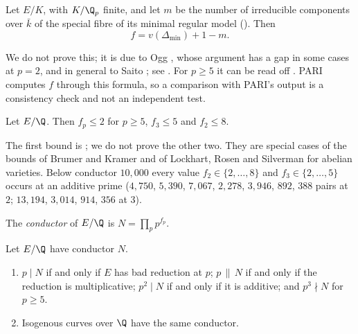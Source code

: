 \begin{theorem}\label{thm:reduction:ogg}
Let $E/K$, with $K/\Q_p$ finite, and let $m$ be the number of irreducible components over $\bar k$ of the special
fibre of its minimal regular model (). Then
\[
f=v(\Delta_{\min})+1-m .
\]
\end{theorem}

We do not prove this; it is due to Ogg \cite{Ogg}, whose argument has a gap in some cases at $p=2$, and in general to
Saito \cite{Saito88}; see \cite[IV.11]{SilvermanATAEC}. For $p\ge5$ it can be read off . PARI computes
$f$ through this formula, so a comparison with PARI's output is a consistency check and not an independent test.

\begin{theorem}\label{thm:reduction:conductor-bounds}
Let $E/\Q$. Then $f_p\le2$ for $p\ge5$, $f_3\le5$ and $f_2\le8$.
\end{theorem}

The first bound is ; we do not prove the other two. They are special cases of the
bounds of Brumer and Kramer \cite{BrumerKramer94} and of Lockhart, Rosen and Silverman \cite{LockhartRosenSilverman93} for
abelian varieties. Below conductor $10{,}000$ every value $f_2\in\{2,\dots,8\}$ and $f_3\in\{2,\dots,5\}$ occurs at an additive
prime ($4{,}750$, $5{,}390$, $7{,}067$, $2{,}278$, $3{,}946$, $892$, $388$ pairs at $2$; $13{,}194$, $3{,}014$, $914$, $356$ at
$3$).

\begin{definition}\label{def:reduction:conductor}
The \emph{conductor} of $E/\Q$ is $N=\prod_pp^{f_p}$.
\end{definition}

\begin{proposition}\label{prop:reduction:conductor-properties}
Let $E/\Q$ have conductor $N$.
\begin{enumerate}[label=(\roman*)]
\item $p\mid N$ if and only if $E$ has bad reduction at $p$; $p\,\|\,N$ if and only if the reduction is multiplicative;
$p^2\mid N$ if and only if it is additive; and $p^3\nmid N$ for $p\ge5$.
\item Isogenous curves over $\Q$ have the same conductor.
\end{enumerate}
\end{proposition}


